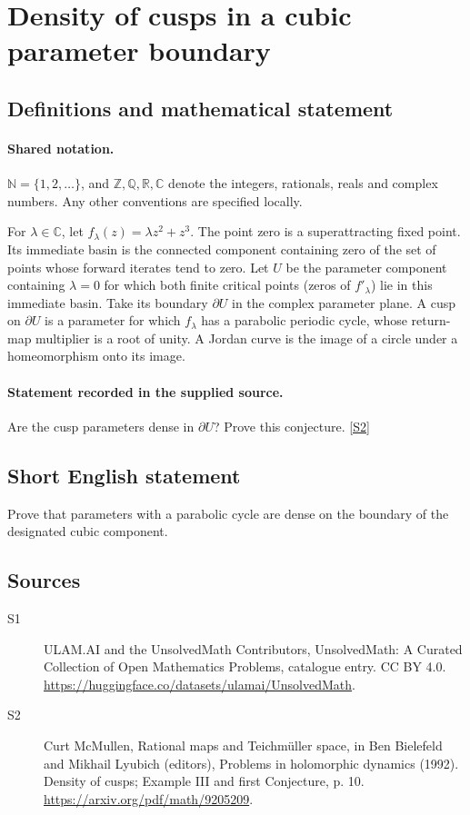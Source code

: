 \documentclass[11pt]{article}
\newcommand{\sref}[2]{\hyperlink{source:#1:#2}{[S#2]}}
\begin{document}
\section{Density of cusps in a cubic parameter boundary}\label{statement}

\subsection{Definitions and mathematical statement}

\paragraph{Shared notation.}$\mathbb N=\{1,2,\ldots\}$, and $\mathbb Z,\mathbb Q,\mathbb R,\mathbb C$ denote the integers, rationals, reals and complex numbers. Any other conventions are specified locally.


For $\lambda\in\mathbb C$, let $f_\lambda(z)=\lambda z^2+z^3$. The point zero is a superattracting fixed point. Its immediate basin is the connected component containing zero of the set of points whose forward iterates tend to zero. Let $U$ be the parameter component containing $\lambda=0$ for which both finite critical points (zeros of $f'_\lambda$) lie in this immediate basin. Take its boundary $\partial U$ in the complex parameter plane. A cusp on $\partial U$ is a parameter for which $f_\lambda$ has a parabolic periodic cycle, whose return-map multiplier is a root of unity. A Jordan curve is the image of a circle under a homeomorphism onto its image.
\paragraph{Statement recorded in the supplied source.}
Are the cusp parameters dense in $\partial U$? Prove this conjecture. \sref{statement}{2}
\subsection{Short English statement}
Prove that parameters with a parabolic cycle are dense on the boundary of the designated cubic component.
\subsection{Sources}
\begin{description}
\item[\hypertarget{source:statement:1}{S1}] ULAM.AI and the UnsolvedMath Contributors, UnsolvedMath: A Curated Collection of Open Mathematics Problems, catalogue entry. CC BY 4.0. \url{https://huggingface.co/datasets/ulamai/UnsolvedMath}.
\item[\hypertarget{source:statement:2}{S2}] Curt McMullen, Rational maps and Teichmüller space, in Ben Bielefeld and Mikhail Lyubich (editors), Problems in holomorphic dynamics (1992). Density of cusps; Example III and first Conjecture, p. 10. \url{https://arxiv.org/pdf/math/9205209}.
\end{description}
\label{end:statement}
\end{document}
